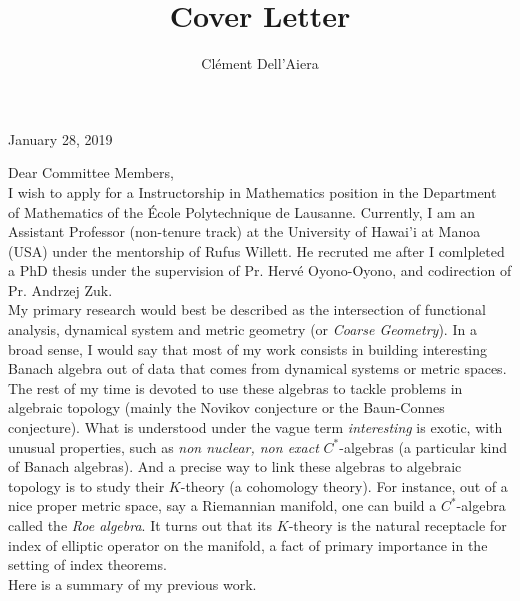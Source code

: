 \documentclass[a4paper]{article}
\title{Cover Letter}
\date{}
\author{ Clément Dell'Aiera}
\begin{document}
\maketitle
January 28, 2019

Dear Committee Members,\\

I wish to apply for a Instructorship in Mathematics position in the Department of Mathematics of the \'Ecole Polytechnique de Lausanne. Currently, I am an Assistant Professor (non-tenure track) at the University of Hawai'i at Manoa (USA) under the mentorship of Rufus Willett. He recruted me after I comlpleted a PhD thesis under the supervision of Pr. Hervé Oyono-Oyono, and codirection of Pr. Andrzej Zuk.\\

My primary research would best be described as the intersection of functional analysis, dynamical system and metric geometry (or \textit{Coarse Geometry}). In a broad sense, I would say that most of my work consists in building interesting Banach algebra out of data that comes from dynamical systems or metric spaces. The rest of my time is devoted to use these algebras to tackle problems in algebraic topology (mainly the Novikov conjecture or the Baun-Connes conjecture). What is understood under the vague term \textit{interesting} is exotic, with unusual properties, such as \textit{non nuclear, non exact} $C^*$-algebras (a particular kind of Banach algebras). And a precise way to link these algebras to algebraic topology is to study their $K$-theory (a cohomology theory). For instance, out of a nice proper metric space, say a Riemannian manifold, one can build a $C^*$-algebra called the \textit{Roe algebra}. It turns out that its $K$-theory is the natural receptacle for index of elliptic operator on the manifold, a fact of primary importance in the setting of index theorems.\\    

Here is a summary of my previous work. \\
\end{document}
